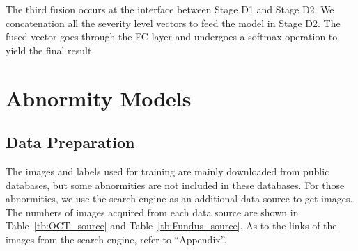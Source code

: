 \documentclass{article}
\begin{document}
	The third fusion occurs at the interface between Stage D1 and Stage D2. We concatenation all the severity level vectors to feed the model in Stage D2. The fused vector goes through the FC layer and undergoes a softmax operation to yield the final result.
	

	\section{Abnormity Models}
	
	\subsection{Data Preparation}
	
	The images and labels used for training are mainly downloaded from public databases, but some abnormities are not included in these databases. For those abnormities, we use the search engine as an additional data source to get images. The numbers of images acquired from each data source are shown in Table~\ref{tb:OCT_source} and Table~\ref{tb:Fundus_source}. As to the links of the images from the search engine, refer to ``Appendix''. 
	
\end{document}
